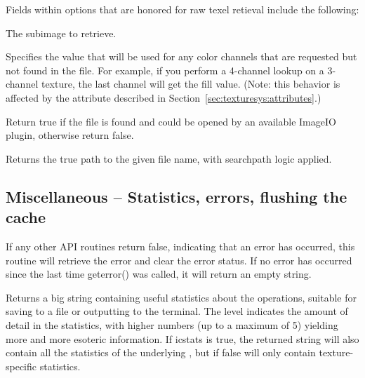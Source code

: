 Fields within {\cf options} that are honored for raw texel retieval
include the following:

\vspace{-12pt}
\vspace{10pt}
The subimage to retrieve.
\apiend


\vspace{-24pt}
\vspace{10pt}
Specifies the value that will be used for any color channels that are
requested but not found in the file.  For example, if you perform a
4-channel lookup on a 3-channel texture, the last channel will
get the fill value.  (Note: this behavior is affected by the
 attribute described in 
Section~\ref{sec:texturesys:attributes}.)
\apiend

Return true if the file is found and could be opened by an
available ImageIO plugin, otherwise return false.

\apiend

Returns the true path to the given file name, with searchpath logic
applied.
\apiend

\subsection{Miscellaneous -- Statistics, errors, flushing the cache}
\label{sec:texturesys:api:geterror}
\label{sec:texturesys:api:getstats}
\label{sec:texturesys:api:resetstats}
\label{sec:texturesys:api:invalidate}

If any other API routines return {\cf false}, indicating that an
error has occurred, this routine will retrieve the error and clear
the error status.  If no error has occurred since the last time
{\cf geterror()} was called, it will return an empty string.
\apiend

Returns a big string containing useful statistics about the \ImageCache
operations, suitable for saving to a file or outputting to the terminal.
The {\cf level} indicates the amount of detail in the statistics,
with higher numbers (up to a maximum of 5) yielding more and more
esoteric information.  If {\cf icstats} is true, the returned string
will also contain all the statistics of the underlying \ImageCache,
but if false will only contain texture-specific statistics.
\apiend

